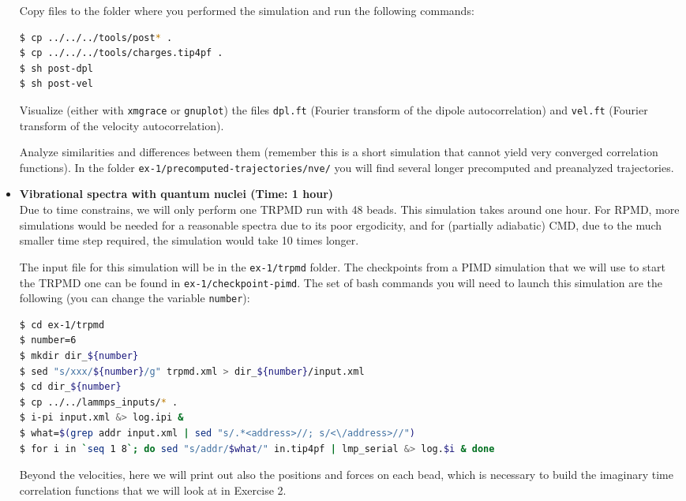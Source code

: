 \documentclass{article}
\begin{document}
\begin{Exercise}[label={realtime},title={Velocity and dipole real time correlation functions}]
\begin{itemize}
Copy files to the folder where you performed the simulation and run the following commands:

\begin{lstlisting}[language=Bash,emph={\$}]
$ cp ../../../tools/post* .
$ cp ../../../tools/charges.tip4pf .
$ sh post-dpl
$ sh post-vel
\end{lstlisting}

Visualize (either with \texttt{xmgrace} or \texttt{gnuplot}) the files \texttt{dpl.ft} (Fourier transform of the dipole autocorrelation) and \texttt{vel.ft} (Fourier transform of the velocity autocorrelation). 

Analyze similarities and differences between them (remember this is a short simulation that cannot yield very converged correlation functions). In the folder \texttt{ex-1/precomputed-trajectories/nve/} you will find several longer precomputed and preanalyzed trajectories.


\item {\bf Vibrational spectra with quantum nuclei (Time: 1 hour)} \\
Due to time constrains, we will only perform one TRPMD run with 48 beads.
This simulation takes around one hour. For RPMD, more simulations would be needed for a reasonable spectra due to its poor ergodicity, and for (partially adiabatic) CMD, due to the much smaller time step required, the simulation would take 10 times longer.

The input file for this simulation will be in the \texttt{ex-1/trpmd} folder. The checkpoints from a PIMD simulation that we will use to start the TRPMD one can be found in \texttt{ex-1/checkpoint-pimd}. The set of bash commands you will need to launch this simulation are the following (you can change the variable \texttt{number}):

\begin{lstlisting}[language=Bash,emph={\$}]
$ cd ex-1/trpmd
$ number=6
$ mkdir dir_${number} 
$ sed "s/xxx/${number}/g" trpmd.xml > dir_${number}/input.xml
$ cd dir_${number}
$ cp ../../lammps_inputs/* .
$ i-pi input.xml &> log.ipi &
$ what=$(grep addr input.xml | sed "s/.*<address>//; s/<\/address>//")
$ for i in `seq 1 8`; do sed "s/addr/$what/" in.tip4pf | lmp_serial &> log.$i & done
\end{lstlisting}


Beyond the velocities, here we will print out also the positions and forces on each bead, which is necessary to build the imaginary time correlation functions that we will look at in Exercise 2.


\end{itemize}
\end{Exercise}
\end{document}
